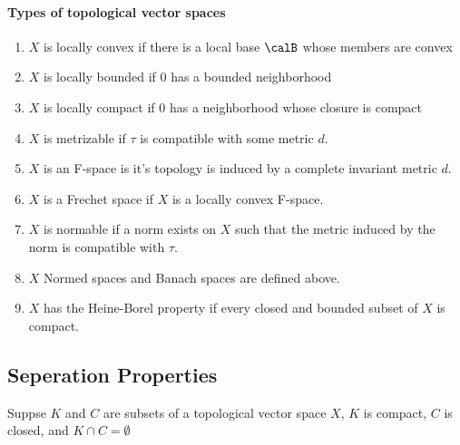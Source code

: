 \paragraph{Types of topological vector spaces}

\begin{enumerate}
	\item $X$ is locally convex if there is a local base $\calB$ whose members are convex 
	\item $X$ is locally bounded if 0 has a bounded neighborhood 
	\item $X$ is locally compact if 0 has a neighborhood whose closure is compact 
	\item $X$ is metrizable if $\tau$ is compatible with some metric $d$.
	\item $X$ is an F-space is it's topology is induced by a complete invariant metric $d$. 
	\item $X$ is a Frechet space if $X$ is a locally convex F-space.
	\item $X$ is normable if a norm exists on $X$ such that the metric induced by the norm is compatible with $\tau$.
	\item $X$ Normed spaces and Banach spaces are defined above.
	\item $X$ has the Heine-Borel property if every closed and bounded subset of $X$ is compact.
\end{enumerate}


\subsection{Seperation Properties}

\begin{theorem}
	Suppse $K$ and $C$ are subsets of a topological vector space $X$, $K$ is compact, $C$ is closed, and $K\cap C = \emptyset$  
\end{theorem}












